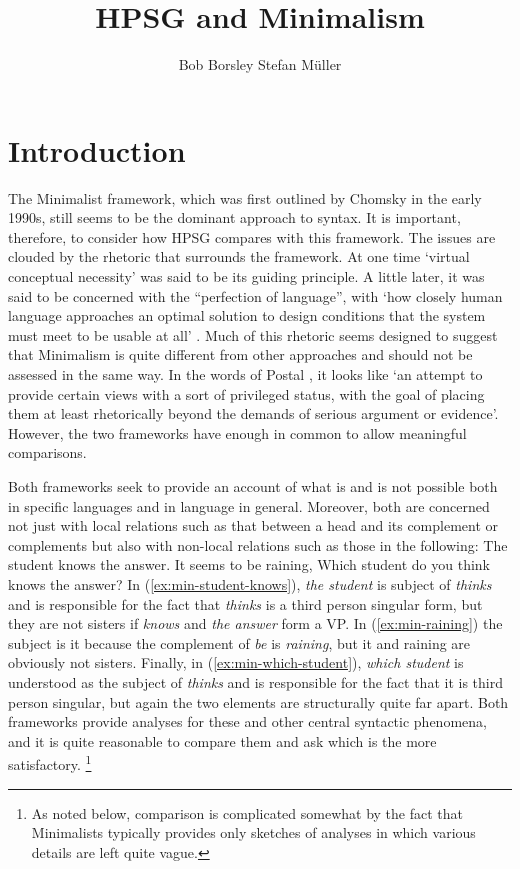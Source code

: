 \documentclass[output=paper]{langsci/langscibook}
\author{%
	Bob Borsley\affiliation{University of Essex}%
	\lastand Stefan Müller\affiliation{Humboldt-Universität zu Berlin}%
}
\title{HPSG and Minimalism}
\begin{document}
\section{Introduction}
\label{sec:min-intro}

The Minimalist framework, which was first outlined by Chomsky in the early 1990s, still seems to be the dominant approach to syntax. It is important, therefore, to consider how HPSG compares with this framework. The issues are clouded by the rhetoric that surrounds the framework. At one time `virtual conceptual necessity' was said to be its guiding principle. A little later, it was said to be concerned with the ``perfection of language'', with `how closely human language approaches an optimal solution to design conditions that the system must meet to be usable at all' \citet[58]{Chomsky2002a-u}. Much of this rhetoric seems designed to suggest that Minimalism is quite different from other approaches and should not be assessed in the same way. In the words of Postal \citet[19]{Postal2003a}, it looks like `an attempt to provide certain views with a sort of privileged status, with the goal of placing them at least rhetorically beyond the demands of serious argument or evidence'. However, the two frameworks have enough in common to allow meaningful comparisons.

Both frameworks seek to provide an account of what is and is not possible both in specific languages and in language in general. Moreover, both are concerned not just with local relations such as that between a head and its complement or complements but also with non-local relations such as those in the following:
\ea\label{ex:min-student-knows}
The student knows the answer.
\z
\ea\label{ex:min-raining}
It seems to be raining,
\z
\ea\label{ex:min-which-student}
Which student do you think knows the answer? 
\z
In (\ref{ex:min-student-knows}), \textit{the student} is subject of \textit{thinks} and is responsible for the fact that \textit{thinks} is a third person singular form, but they are not sisters if \textit{knows} and \textit{the answer} form a VP. In (\ref{ex:min-raining}) the subject is it because the complement of \textit{be} is \textit{raining}, but it and raining are obviously not sisters. Finally, in (\ref{ex:min-which-student}), \textit{which student} is understood as the subject of \textit{thinks} and is responsible for the fact that it is third person singular, but again the two elements are structurally quite far apart. Both frameworks provide analyses for these and other central syntactic phenomena, and it is quite reasonable to compare them and ask which is the more satisfactory.%
	\footnote{As noted below, comparison is complicated somewhat by the fact that Minimalists typically provides only sketches of analyses in which various details are left quite vague.}%
\end{document}
